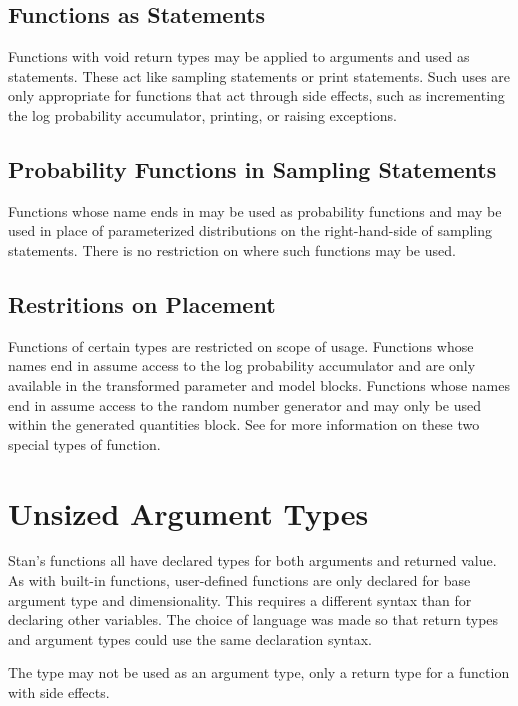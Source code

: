\subsection{Functions as Statements}

Functions with void return types may be applied to arguments and used
as statements.  These act like sampling statements or print
statements.  Such uses are only appropriate for functions that act
through side effects, such as incrementing the log probability
accumulator, printing, or raising exceptions.

\subsection{Probability Functions in Sampling Statements}

Functions whose name ends in  may be used as probability
functions and may be used in place of parameterized distributions on
the right-hand-side of sampling statements.   There is no restriction
on where such functions may be used.

\subsection{Restritions on Placement}

Functions of certain types are restricted on scope of usage.
Functions whose names end in  assume access to the log
probability accumulator and are only available in the transformed
parameter and model blocks.  Functions whose names end in 
assume access to the random number generator and may only be used
within the generated quantities block.  See  for more
information on these two special types of function. 

\section{Unsized Argument Types}

Stan's functions all have declared types for both arguments and
returned value.  As with built-in functions, user-defined functions are
only declared for base argument type and dimensionality.  This
requires a different syntax than for declaring other variables.  The
choice of language was made so that return types and argument types
could use the same declaration syntax.

The type  may not be used as an argument type, only a
return type for a function with side effects.


